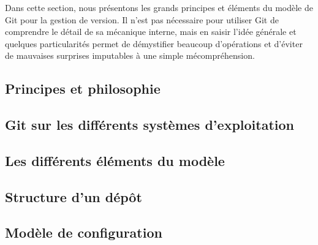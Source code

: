Dans cette section, nous présentons les grands principes et éléments
du modèle de Git pour la gestion de version. Il n'est pas nécessaire
pour utiliser Git de comprendre le détail de sa mécanique interne,
mais en saisir l'idée générale et quelques particularités permet de
démystifier beaucoup d'opérations et d'éviter de mauvaises surprises
imputables à une simple mécompréhension.

\subsection{Principes et philosophie} %


\subsection{Git sur les différents systèmes d'exploitation}\label{GitOS} %

\subsection{Les différents éléments du modèle} %



\subsection{Structure d'un dépôt} %

\subsection{Modèle de configuration} %
